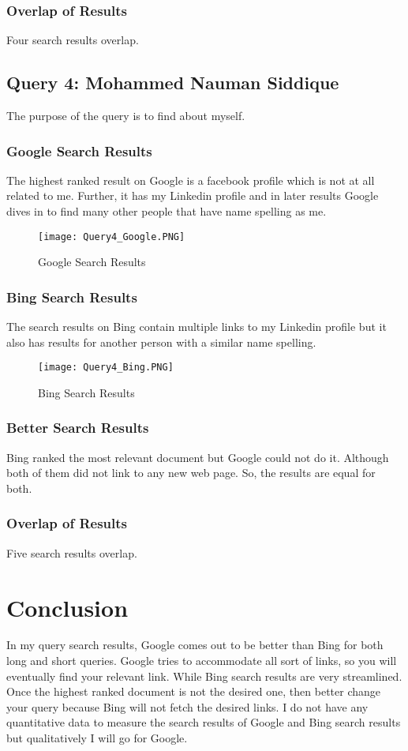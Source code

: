 \documentclass[12pt]{report}
\begin{document}
\subsubsection{Overlap of Results}
Four search results overlap.

\subsection{Query 4: Mohammed Nauman Siddique}
The purpose of the query is to find about myself.
\subsubsection{Google Search Results}
The highest ranked result on Google is a facebook profile which is not at all related to me. Further, it has my Linkedin profile and in later results Google dives in to find many other people that have name spelling as me.

\begin{figure}[ht]
  \centering
  \texttt{[image: Query4\_Google.PNG]}
  \caption{Google Search Results}
  \label{fig:7}
\end{figure}

\subsubsection{Bing Search Results}
The search results on Bing contain multiple links to my Linkedin profile but it also has results for another person with a similar name spelling.

\begin{figure}[ht]
  \centering 
  \texttt{[image: Query4\_Bing.PNG]}
  \caption{Bing Search Results}
  \label{fig:8}
\end{figure}

\subsubsection{Better Search Results}
Bing ranked the most relevant document but Google could not do it. Although both of them did not link to any new web page. So, the results are equal for both.  
\subsubsection{Overlap of Results}
Five search results overlap.

\section{Conclusion}
In my query search results, Google comes out to be better than Bing for both long and short queries. Google tries to accommodate all sort of links, so you will eventually find your relevant link. While Bing search results are very streamlined. Once the highest ranked document is not the desired one, then better change your query because Bing will not fetch the desired links. I do not have any quantitative data to measure the search results of Google and Bing search results but qualitatively I will go for Google. 
\end{document}
